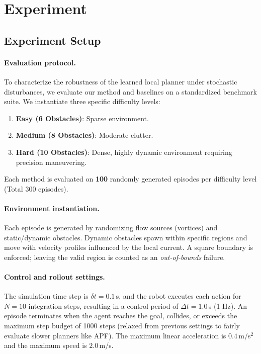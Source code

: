 \section{Experiment}
\label{sec:experiments}

\subsection{Experiment Setup}
\label{sec:exp_setup}

\paragraph{Evaluation protocol.}
To characterize the robustness of the learned local planner under stochastic disturbances, we evaluate our method and baselines on a standardized benchmark suite.
We instantiate three specific difficulty levels:
\begin{enumerate}
    \item \textbf{Easy (6 Obstacles)}: Sparse environment.
    \item \textbf{Medium (8 Obstacles)}: Moderate clutter.
    \item \textbf{Hard (10 Obstacles)}: Dense, highly dynamic environment requiring precision maneuvering.
\end{enumerate}
Each method is evaluated on \textbf{100} randomly generated episodes per difficulty level (Total 300 episodes).

\paragraph{Environment instantiation.}
Each episode is generated by randomizing flow sources (vortices) and static/dynamic obstacles.
Dynamic obstacles spawn within specific regions and move with velocity profiles influenced by the local current.
A square boundary is enforced; leaving the valid region is counted as an \emph{out-of-bounds} failure.

\paragraph{Control and rollout settings.}
The simulation time step is $\delta t = 0.1$\,s, and the robot executes each action for $N=10$ integration steps, resulting in a control period of $\Delta t=1.0$\,s (1 Hz).
An episode terminates when the agent reaches the goal, collides, or exceeds the maximum step budget of 1000 steps (relaxed from previous settings to fairly evaluate slower planners like APF). The maximum linear acceleration is $0.4$\,m/s$^2$ and the maximum speed is $2.0$\,m/s.

